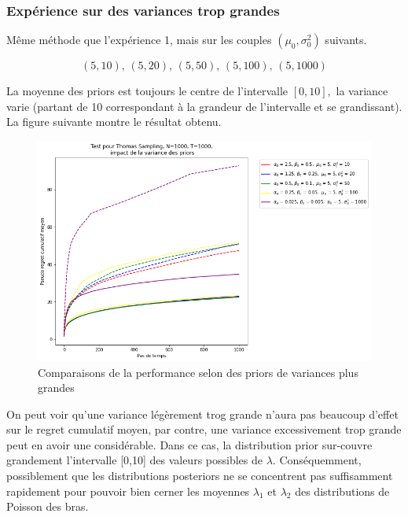 \documentclass[letterpaper,11pt]{article}
\begin{document}
\subsubsection*{Expérience sur des variances trop grandes}

Même méthode que l'expérience 1, mais sur les couples $(\mu_0,\sigma^2_0)$ suivants.

$$(5,10),\,(5,20),\,(5,50),\,(5,100),\,(5,1000)$$

La moyenne des priors est toujours le centre de l'intervalle $[0,10],$ la variance varie (partant de 10 correspondant à la grandeur de l'intervalle et se grandissant).\\

La figure suivante montre le résultat obtenu.

\begin{figure}[H]
\label{figure: variance petite}
\caption{Comparaisons de la performance selon des priors de variances plus grandes}
\begin{center}
\includegraphics[scale=0.5]{etude_variance_grande.png} 
\end{center}
\end{figure}

On peut voir qu'une variance légèrement trog grande n'aura pas beaucoup d'effet sur le regret cumulatif moyen, par contre, une variance excessivement trop grande peut en avoir une considérable. Dans ce cas, la distribution prior sur-couvre grandement l'intervalle [0,10] des valeurs possibles de $\lambda.$ Conséquemment, possiblement que les distributions posteriors ne se concentrent pas suffisamment rapidement pour pouvoir bien cerner les moyennes $\lambda_1$ et $\lambda_2$ des distributions de Poisson des bras.
\end{document}
